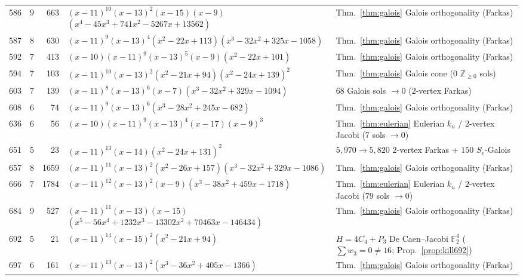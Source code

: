 \documentclass[11pt,reqno]{amsart}
\theoremstyle{definition}
\theoremstyle{remark}
\numberwithin{equation}{section}
\numberwithin{table}{section}
\begin{document}
{\begin{longtable}{@{}rrr>{\raggedright\arraybackslash}p{2.45in}>{\raggedright\arraybackslash}p{2.35in}@{}}
586 & 9 & 663 & $(x-11)^{10}$\allowbreak $(x-13)^2$\allowbreak $(x-15)$\allowbreak $(x-9)$\allowbreak $(x^4-45x^3+741x^2-5267x+13562)$ & Thm.~\ref{thm:galois} Galois orthogonality (Farkas) \\
587 & 8 & 630 & $(x-11)^9$\allowbreak $(x-13)^4$\allowbreak $(x^2-22x+113)$\allowbreak $(x^3-32x^2+325x-1058)$ & Thm.~\ref{thm:galois} Galois orthogonality (Farkas) \\
592 & 7 & 413 & $(x-10)$\allowbreak $(x-11)^9$\allowbreak $(x-13)^5$\allowbreak $(x-9)$\allowbreak $(x^2-22x+101)$ & Thm.~\ref{thm:galois} Galois orthogonality (Farkas) \\
594 & 7 & 103 & $(x-11)^{10}$\allowbreak $(x-13)^2$\allowbreak $(x^2-21x+94)$\allowbreak $(x^2-24x+139)^2$ & Thm.~\ref{thm:galois} Galois cone ($0$ $\mathbb{Z}_{\ge 0}$ sols) \\
603 & 7 & 139 & $(x-11)^8$\allowbreak $(x-13)^6$\allowbreak $(x-7)$\allowbreak $(x^3-32x^2+329x-1094)$ & $68$ Galois sols $\to 0$ ($2$-vertex Farkas) \\
608 & 6 & 74 & $(x-11)^9$\allowbreak $(x-13)^6$\allowbreak $(x^3-28x^2+245x-682)$ & Thm.~\ref{thm:galois} Galois orthogonality (Farkas) \\
636 & 6 & 56 & $(x-10)$\allowbreak $(x-11)^9$\allowbreak $(x-13)^4$\allowbreak $(x-17)$\allowbreak $(x-9)^3$ & Thm.~\ref{thm:eulerian} Eulerian $k_u$ / $2$-vertex Jacobi ($7$ sols $\to 0$) \\
651 & 5 & 23 & $(x-11)^{13}$\allowbreak $(x-14)$\allowbreak $(x^2-24x+131)^2$ & $5{,}970 \to 5{,}820$ $2$-vertex Farkas + $150$ $S_v$-Galois \\
657 & 8 & 1659 & $(x-11)^{11}$\allowbreak $(x-13)^2$\allowbreak $(x^2-26x+157)$\allowbreak $(x^3-32x^2+329x-1086)$ & Thm.~\ref{thm:galois} Galois orthogonality (Farkas) \\
666 & 7 & 1784 & $(x-11)^{12}$\allowbreak $(x-13)^2$\allowbreak $(x-9)$\allowbreak $(x^3-38x^2+459x-1718)$ & Thm.~\ref{thm:eulerian} Eulerian $k_u$ / $2$-vertex Jacobi ($79$ sols $\to 0$) \\
684 & 9 & 527 & $(x-11)^{11}$\allowbreak $(x-13)$\allowbreak $(x-15)$\allowbreak $(x^5-56x^4+1232x^3-13302x^2+70463x-146434)$ & Thm.~\ref{thm:galois} Galois orthogonality (Farkas) \\
692 & 5 & 21 & $(x-11)^{14}$\allowbreak $(x-15)^2$\allowbreak $(x^2-21x+94)$ & $H=4C_4+P_3$ De Caen--Jacobi $\mathbb{F}_2^4$ ($\sum w_3=0\neq 16$; Prop.~\ref{prop:kill692}) \\
697 & 6 & 161 & $(x-11)^{13}$\allowbreak $(x-13)^2$\allowbreak $(x^3-36x^2+405x-1366)$ & Thm.~\ref{thm:galois} Galois orthogonality (Farkas) \\

\end{longtable}}
\end{document}
